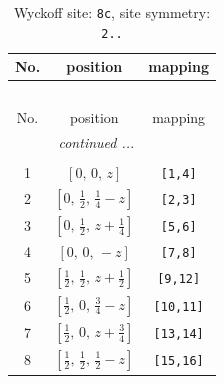 \documentclass[fleqn,8pt]{jsarticle}
\begin{document}
\renewcommand{\arraystretch}{1.2}
\begin{longtable}{ccc}
\caption{Wyckoff site: {\tt 8c}, site symmetry: {\tt 2..}}
 \\
 \hline \hline
No. & position & mapping \\ \hline \endfirsthead

\multicolumn{2}{l}{\tablename\ \thetable{}} \\
 \hline \hline
No. & position & mapping \\ \hline \endhead

 \hline \hline
\multicolumn{2}{r}{\footnotesize\it continued ...} \\ \endfoot

 \hline \hline
\multicolumn{2}{r}{} \\ \endlastfoot

1 & $\left[ 0,\, 0,\, z \right]$ & {\tt [1,4]} \\ \hline
2 & $\left[ 0,\, \frac{1}{2},\, \frac{1}{4} - z \right]$ & {\tt [2,3]} \\ \hline
3 & $\left[ 0,\, \frac{1}{2},\, z + \frac{1}{4} \right]$ & {\tt [5,6]} \\ \hline
4 & $\left[ 0,\, 0,\, - z \right]$ & {\tt [7,8]} \\ \hline
5 & $\left[ \frac{1}{2},\, \frac{1}{2},\, z + \frac{1}{2} \right]$ & {\tt [9,12]} \\ \hline
6 & $\left[ \frac{1}{2},\, 0,\, \frac{3}{4} - z \right]$ & {\tt [10,11]} \\ \hline
7 & $\left[ \frac{1}{2},\, 0,\, z + \frac{3}{4} \right]$ & {\tt [13,14]} \\ \hline
8 & $\left[ \frac{1}{2},\, \frac{1}{2},\, \frac{1}{2} - z \right]$ & {\tt [15,16]} \\
\end{longtable}
\renewcommand{\arraystretch}{1.2}
\end{document}
